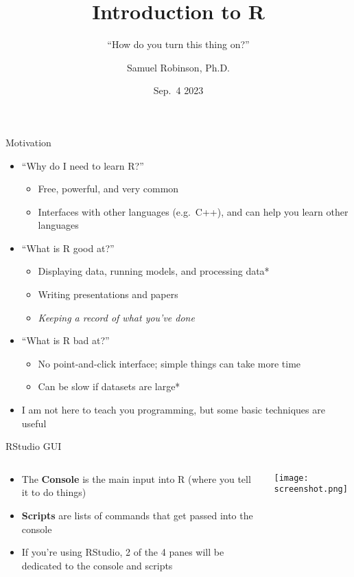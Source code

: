 \documentclass[
  ignorenonframetext,
  aspectratio=169]{beamer}
\title{Introduction to R}
\subtitle{``How do you turn this thing on?''}
\author{Samuel Robinson, Ph.D.}
\date{Sep.~4 2023}
\providecommand{\tightlist}{%
  \setlength{\itemsep}{0pt}\setlength{\parskip}{0pt}}
\begin{document}
\frame{\titlepage}

\begin{frame}{Motivation}
\protect\hypertarget{motivation}{}
\begin{itemize}[<+->]
\tightlist
\item
  ``Why do I need to learn R?''

  \begin{itemize}[<+->]
  \tightlist
  \item
    Free, powerful, and very common
  \item
    Interfaces with other languages (e.g.~C++), and can help you learn
    other languages
  \end{itemize}
\item
  ``What is R good at?''

  \begin{itemize}[<+->]
  \tightlist
  \item
    Displaying data, running models, and processing data*
  \item
    Writing presentations and papers
  \item
    \emph{Keeping a record of what you've done}
  \end{itemize}
\item
  ``What is R bad at?''

  \begin{itemize}[<+->]
  \tightlist
  \item
    No point-and-click interface; simple things can take more time
  \item
    Can be slow if datasets are large*
  \end{itemize}
\item
  I am not here to teach you programming, but some basic techniques are
  useful
\end{itemize}
\end{frame}

\begin{frame}{RStudio GUI}
\protect\hypertarget{rstudio-gui}{}
\begin{columns}[T]
\begin{column}{0.4\textwidth}
\begin{itemize}[<+->]
\tightlist
\item
  The \textbf{Console} is the main input into R (where you tell it to do
  things)
\item
  \textbf{Scripts} are lists of commands that get passed into the
  console
\item
  If you're using RStudio, 2 of the 4 panes will be dedicated to the
  console and scripts
\end{itemize}
\end{column}

\begin{column}{0.6\textwidth}
\texttt{[image: screenshot.png]}
\end{column}
\end{columns}
\end{frame}
\end{document}
